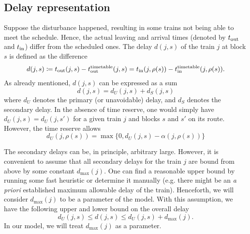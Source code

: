 \subsection{Delay representation}
Suppose the disturbance happened, resulting in some trains not being able to meet the schedule.
Hence, the actual leaving and arrival times (denoted by $t_\text{out}$ and $t_\text{in}$) differ from the
scheduled ones. The delay $d(j, s)$ of the train $j$ at block $s$ is defined as the difference
\begin{equation}
	\label{eq:djs}
	d(j, s) \coloneqq t_\text{out}(j, s) - t_\text{out}^\text{timetable}(j, s) = t_\text{in}(j, \rho(s)) - t_\text{in}^\text{timetable}(j, \rho(s)).
\end{equation}
As already mentioned, $d(j, s)$ can be expressed as a sum
\begin{equation}
	d(j, s) = d_U(j, s) + d_S(j, s)
\end{equation}
where $d_U$ denotes the primary (or unavoidable) delay, and $d_S$ denotes the secondary delay.  In
the absence of time reserve, one would simply have $d_U(j, s) = d_U(j, s')$ for a given train $j$
and blocks $s$ and $s'$ on its route. However, the time reserve allows
\begin{equation}
	d_U(j, \rho(s)) = \max\{0, d_U(j, s) - \alpha(j, \rho(s))\}
\end{equation}

The secondary delays can be, in principle, arbitrary large. However, it is convenient to assume that
all secondary delays for the train $j$ are bound from above by some constant $d_{\max}(j)$. One can find
a reasonable upper bound by running some fast heuristic or determine it manually (e.g. there might
be an \emph{a priori} established maximum allowable delay of the train). Henceforth, we will consider
$d_{\max}(j)$ to be a parameter of the model. With this assumption, we have the following upper and
lower bound on the overall delay
\begin{equation}
	d_U(j, s) \le d(j, s) \le d_U(j, s) + d_{\max}(j).
\end{equation}
In our model, we will treat $d_{\max}(j)$ as a parameter.

